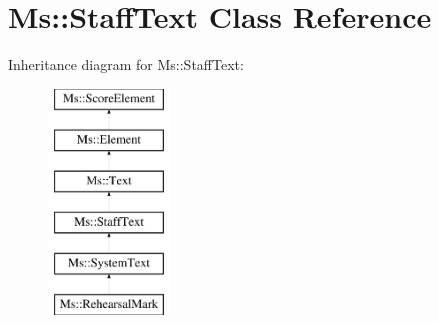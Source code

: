 \hypertarget{class_ms_1_1_staff_text}{}\section{Ms\+:\+:Staff\+Text Class Reference}
\label{class_ms_1_1_staff_text}
Inheritance diagram for Ms\+:\+:Staff\+Text\+:\begin{figure}[H]
\begin{center}
\leavevmode
\includegraphics[height=6.000000cm]{class_ms_1_1_staff_text}
\end{center}
\end{figure}
